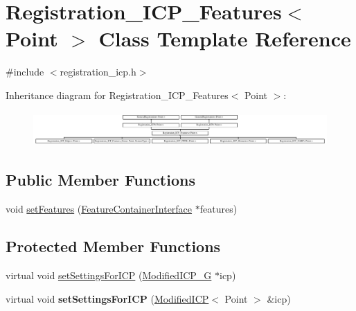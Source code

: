 \hypertarget{classRegistration__ICP__Features}{
\section{Registration\_\-ICP\_\-Features$<$ Point $>$ Class Template Reference}
\label{classRegistration__ICP__Features}
}


{\ttfamily \#include $<$registration\_\-icp.h$>$}

Inheritance diagram for Registration\_\-ICP\_\-Features$<$ Point $>$:\begin{figure}[H]
\begin{center}
\leavevmode
\includegraphics[height=1.321534cm]{classRegistration__ICP__Features}
\end{center}
\end{figure}
\subsection*{Public Member Functions}
\begin{DoxyCompactItemize}
\item 
void \hyperlink{classRegistration__ICP__Features_a63a46214a8b176447ba6ee0986d2dea5}{setFeatures} (\hyperlink{classFeatureContainerInterface}{FeatureContainerInterface} $\ast$features)
\end{DoxyCompactItemize}
\subsection*{Protected Member Functions}
\begin{DoxyCompactItemize}
\item 
virtual void \hyperlink{classRegistration__ICP__Features_a944cd0d0d248afc66b9833f0cfd322ed}{setSettingsForICP} (\hyperlink{classModifiedICP__G}{ModifiedICP\_\-G} $\ast$icp)
\item 
\hypertarget{classRegistration__ICP__Features_abbc0a01f50b62453b469a7f044751644}{
virtual void {\bfseries setSettingsForICP} (\hyperlink{classModifiedICP}{ModifiedICP}$<$ Point $>$ \&icp)}
\label{classRegistration__ICP__Features_abbc0a01f50b62453b469a7f044751644}

\end{DoxyCompactItemize}

